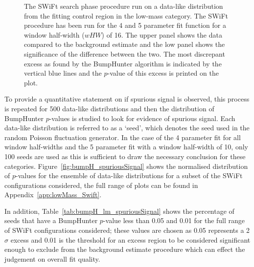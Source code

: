 \begin{figure}[!htb]
\vspace{10pt}
\caption{\label{fig:bhFit_lm_corrFitCR_dataLike}
  The SWiFt search phase procedure run on a data-like distribution
  from the fitting control region in the low-mass category.
  The SWiFt procedure has been run for the 4 and 5 parameter fit function for a window half-width ($wHW$) of 16.
  The upper panel shows the data compared to the background estimate and the low panel shows the significance of the difference between the two.
  The most discrepant excess as found by the {\sc BumpHunter} algorithm is indicated by the vertical blue lines and the \mbox{$p$-value} of this excess is printed on the plot. 
}
\end{figure}

To provide a quantitative statement on if spurious signal is observed,
this process is repeated for 500 data-like distributions and then the distribution of {\sc BumpHunter} \mbox{$p$-value}s is studied to look for evidence of spurious signal.
Each data-like distribution is referred to as a `seed', which denotes the seed used in the random Poisson fluctuation generator.
In the case of the 4 parameter fit for all window half-widths and the 5 parameter fit with a window half-width of 10,
only 100 seeds are used as this is sufficient to draw the necessary conclusion for these categories.
Figure~\ref{fig:bumpH_spuriousSignal} shows the normalised distribution of \mbox{$p$-value}s for the ensemble of data-like distributions
for a subset of the SWiFt configurations considered, the full range of plots can be found in Appendix~\ref{app:lowMass_Swift}.

In addition, Table~\ref{tab:bumpH_lm_spuriousSignal} shows the percentage of seeds that have a {\sc BumpHunter} \mbox{$p$-value} less than %
0.05 and 0.01 for the full range of SWiFt configurations considered;
these values are chosen as 0.05 represents a 2$\sigma$ excess and
0.01 is the threshold for an excess region to be considered significant enough
to exclude from the background estimate procedure which can effect the judgement on overall fit quality.


